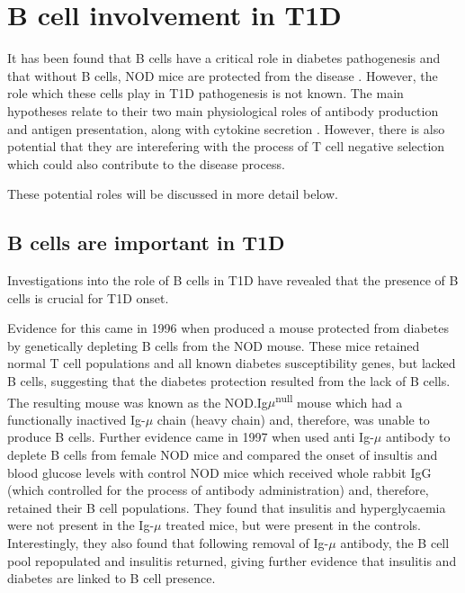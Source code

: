 \section{B cell involvement in T1D}
\label{sec:BcellsinT1D}

It has been found that B cells have a critical role in diabetes pathogenesis and that without B cells, NOD mice are protected from the disease \citep{Serreze1996, Noorchashm1997}.
However, the role which these cells play in T1D pathogenesis is not known.
The main hypotheses relate to their two main physiological roles of antibody production and antigen presentation, along with cytokine secretion \citep{Hinman2014}.
However, there is also potential that they are interefering with the process of T cell negative selection which could also contribute to the disease process.

These potential roles will be discussed in more detail below.

\subsection{B cells are important in T1D}

Investigations into the role of B cells in T1D have revealed that the presence of B cells is crucial for T1D onset.

Evidence for this came in 1996 when \citet{Serreze1996} produced a mouse protected from diabetes by genetically depleting B cells from the NOD mouse.
These mice retained normal T cell populations and all known diabetes susceptibility genes, but lacked B cells, suggesting that the diabetes protection resulted from the lack of B cells.
The resulting mouse was known as the NOD.Ig$\mu$\textsuperscript{null} mouse which had a functionally inactived Ig-$\mu$ chain (heavy chain) and, therefore, was unable to produce B cells.
Further evidence came in 1997 when \citet{Noorchashm1997} used anti Ig-$\mu$ antibody to deplete B cells from female NOD mice and compared the onset of insultis and blood glucose levels with control NOD mice which received whole rabbit IgG (which controlled for the process of antibody administration) and, therefore, retained their B cell populations.
They found that insulitis and hyperglycaemia were not present in the Ig-$\mu$ treated mice, but were present in the controls.
Interestingly, they also found that following removal of Ig-$\mu$ antibody, the B cell pool repopulated and insulitis returned, giving further evidence that insulitis and diabetes are linked to B cell presence.

